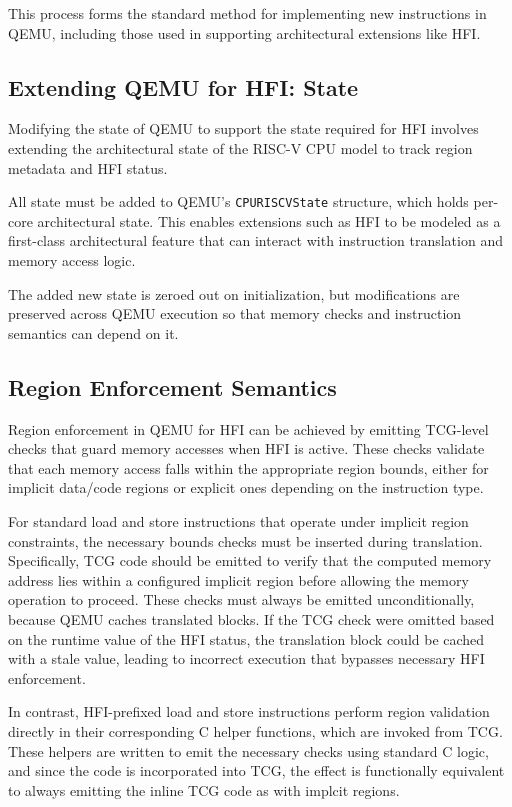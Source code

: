 \documentclass[conference,compsoc]{IEEEtran}
\begin{document}
This process forms the standard method for implementing new instructions in QEMU, including those used in supporting architectural extensions like HFI.

\subsection{Extending QEMU for HFI: State}
Modifying the state of QEMU to support the state required for HFI involves extending the architectural state of the RISC-V CPU model to track region metadata and HFI status.

All state must be added to QEMU's \texttt{CPURISCVState} structure, which holds per-core architectural state. This enables extensions such as HFI to be modeled as a first-class architectural feature that can interact with instruction translation and memory access logic.

The added new state is zeroed out on initialization, but modifications are preserved across QEMU execution so that memory checks and instruction semantics can depend on it. 

\subsection{Region Enforcement Semantics}
Region enforcement in QEMU for HFI can be achieved by emitting TCG-level checks that guard memory accesses when HFI is active. These checks validate that each memory access falls within the appropriate region bounds, either for implicit data/code regions or explicit ones depending on the instruction type.

For standard load and store instructions that operate under implicit region constraints, the necessary bounds checks must be inserted during translation. Specifically, TCG code should be emitted to verify that the computed memory address lies within a configured implicit region before allowing the memory operation to proceed. These checks must always be emitted unconditionally, because QEMU caches translated blocks. If the TCG check were omitted based on the runtime value of the HFI status, the translation block could be cached with a stale value, leading to incorrect execution that bypasses necessary HFI enforcement.

In contrast, HFI-prefixed load and store instructions perform region validation directly in their corresponding C helper functions, which are invoked from TCG. These helpers are written to emit the necessary checks using standard C logic, and since the code is incorporated into TCG, the effect is functionally equivalent to always emitting the inline TCG code as with implcit regions.
\end{document}

